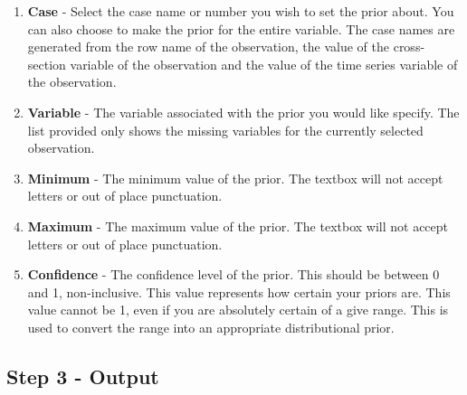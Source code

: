 \documentclass[12pt,titlepage]{article}
\begin{document}
\begin{enumerate}
\item \textbf{Case} - Select the case name or number you wish to set the prior
  about.  You can also choose to make the prior for the entire variable.  The
  case names are generated from the row name of the observation, the value of the
  cross-section variable of the observation and the value of the time series
  variable of the observation.  
\item \textbf{Variable} - The variable associated with the prior you would like
  specify.  The list provided only shows the missing variables for the currently
  selected observation.  
\item \textbf{Minimum} - The minimum value of the prior. The textbox will not accept
  letters or out of place punctuation.
\item \textbf{Maximum} - The maximum value of the prior. The textbox will not accept
  letters or out of place punctuation.
\item \textbf{Confidence} - The confidence level of the prior.  This should be
  between 0 and 1, non-inclusive.  This value represents how certain your priors
  are.  This value cannot be 1, even if you are absolutely certain of a give
  range.  This is used to convert the range into an appropriate distributional
  prior.  
\end{enumerate}


\subsection{Step 3 - Output}
\label{sec:step3}
\end{document}
